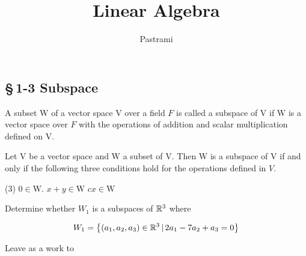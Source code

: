 %
% 




\title{Linear Algebra} %

\author{Pastrami}%


	\maketitle
	\subsection*{\S\,1-3 Subspace}
	\begin{defn}[Subspace]
A subset \(\mathrm{W}\) of a vector space \(\mathrm{V}\) over a field \(F\) is called a
subspace of \(\mathrm{V}\) if \(\mathrm{W}\) is a vector space over \(F\) with the operations of addition
and scalar multiplication defined on \(\mathrm{V}\).
	\end{defn}
	
	\begin{thm*}
	 Let \(\mathrm{V}\) be a vector space and \(\mathrm{W}\) a subset of \(\mathrm{V} .\) Then \(\mathrm{W}\)
is a subspace of \(\mathrm{V}\) if and only if the following three conditions hold for the
operations defined in \(V .\)
\begin{tasks}(3)
	\task [(i)]   \quad\(0 \in \mathrm{W} .\)
	\task [(ii)]  \quad\(x+y \in \mathrm{W}\) 
	\task [(iii)] \quad\(c x \in \mathrm{W}\) 
\end{tasks}
	\end{thm*}
	\begin{example}
		 Determine whether $W_1$ is a subspaces of $\mathbb{R}^3$ where
		 
		  \[W_1 = \left\{(a_1,a_2,a_3)\in\mathbb{R}^3\,|\,2a_1-7a_2+a_3 = 0\right\}\]
		  
		  \begin{sol*}
		    Leave as a work to 
		  \end{sol*}
	\end{example}
	

